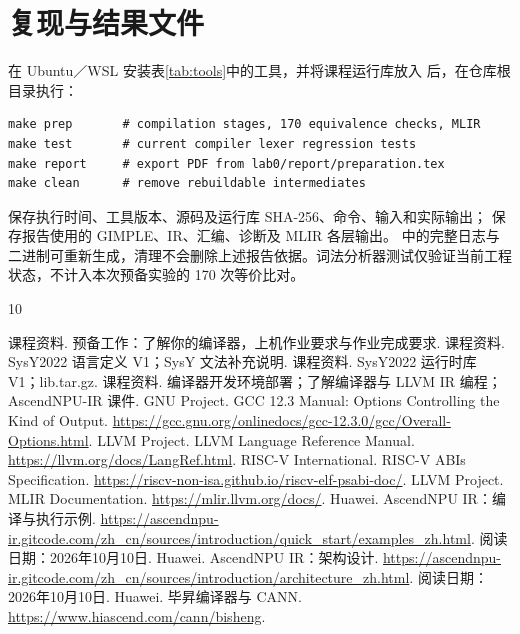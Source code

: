 \documentclass[UTF8,a4paper,10pt,fontset=fandol]{ctexart}
\renewcommand{\sectionmark}[1]{\markboth{\chinese{section}、#1}{}}
\begin{document}
\appendix
{}
\renewcommand{\sectionmark}[1]{\markboth{附录\Alph{section}\quad #1}{}}
\section{复现与结果文件}
在 Ubuntu／WSL 安装表\ref{tab:tools}中的工具，并将课程运行库放入  后，在仓库根目录执行：
\par\noindent\begin{minipage}{\linewidth}
\begin{lstlisting}[numbers=none]
make prep       # compilation stages, 170 equivalence checks, MLIR
make test       # current compiler lexer regression tests
make report     # export PDF from lab0/report/preparation.tex
make clean      # remove rebuildable intermediates
\end{lstlisting}
\end{minipage}\par
{} 保存执行时间、工具版本、源码及运行库 SHA-256、命令、输入和实际输出； 保存报告使用的 GIMPLE、IR、汇编、诊断及 MLIR 各层输出。 中的完整日志与二进制可重新生成，清理不会删除上述报告依据。词法分析器测试仅验证当前工程状态，不计入本次预备实验的 170 次等价比对。

\clearpage
\begin{thebibliography}{10}
 课程资料. 预备工作：了解你的编译器，上机作业要求与作业完成要求.
 课程资料. SysY2022 语言定义 V1；SysY 文法补充说明.
 课程资料. SysY2022 运行时库 V1；lib.tar.gz.
 课程资料. 编译器开发环境部署；了解编译器与 LLVM IR 编程；AscendNPU-IR 课件.
 GNU Project. GCC 12.3 Manual: Options Controlling the Kind of Output. \url{https://gcc.gnu.org/onlinedocs/gcc-12.3.0/gcc/Overall-Options.html}.
 LLVM Project. LLVM Language Reference Manual. \url{https://llvm.org/docs/LangRef.html}.
 RISC-V International. RISC-V ABIs Specification. \url{https://riscv-non-isa.github.io/riscv-elf-psabi-doc/}.
 LLVM Project. MLIR Documentation. \url{https://mlir.llvm.org/docs/}.
 Huawei. AscendNPU IR：编译与执行示例. \url{https://ascendnpu-ir.gitcode.com/zh_cn/sources/introduction/quick_start/examples_zh.html}. 阅读日期：2026年10月10日.
 Huawei. AscendNPU IR：架构设计. \url{https://ascendnpu-ir.gitcode.com/zh_cn/sources/introduction/architecture_zh.html}. 阅读日期：2026年10月10日.
 Huawei. 毕昇编译器与 CANN. \url{https://www.hiascend.com/cann/bisheng}.
\end{thebibliography}
\end{document}
